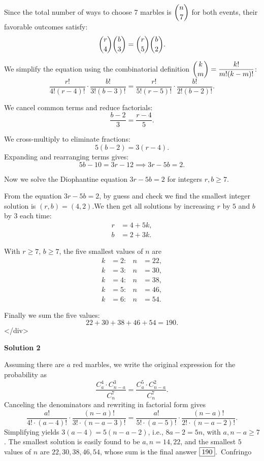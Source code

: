 \begin{enumerate}
 Since the total number of ways to choose 7 marbles is $\dbinom{n}{7}$ for both events, their favorable outcomes satisfy:
 \[\dbinom{r}{4}\dbinom{b}{3}=\dbinom{r}{5}\dbinom{b}{2}.\]

 We simplify the equation using the combinatorial definition $\dbinom{k}{m}=\dfrac{k!}{m!(k-m)!}$:
 \[\frac{r!}{4!(r-4)!}\cdot\frac{b!}{3!(b-3)!}=\frac{r!}{5!(r-5)!}\cdot\frac{b!}{2!(b-2)!}.\]

 We cancel common terms and reduce factorials:
 \[\frac{b-2}{3}=\frac{r-4}{5}.\]

 We cross-multiply to eliminate fractions:
 \[5(b-2)=3(r-4).\]Expanding and rearranging terms gives:
 \[5b-10=3r-12 \implies 3r-5b=2.\]

 Now we solve the Diophantine equation $3r-5b=2$ for integers $r,b\geq7$.

 From the equation $3r - 5b = 2$, by guess and check we find the smallest integer solution is $(r,b) = (4,2)$.We then get all solutions by increasing $r$ by $5$ and $b$ by $3$ each time:\begin{align*}r &= 4 + 5k, \\b &= 2 + 3k.\end{align*}


 With $r\ge7$, $b\ge7$, the five smallest values of $n$ are\begin{align*}k &= 2: & n &= 22, \\k &= 3: & n &= 30, \\k &= 4: & n &= 38, \\k &= 5: & n &= 46, \\k &= 6: & n &= 54.\end{align*}


 Finally we sum the five values:
 \[22+30+38+46+54=\boxed{190}.\]
</div>



\textbf{Solution 2}

Assuming there are $a$ red marbles, we write the original expression for the probability as 
 \[\dfrac{C_a^4\cdot C_{n-a}^3}{C_n^7}=\dfrac{C_a^5\cdot C_{n-a}^2}{C_n^7}.\]Canceling the denominators and rewriting in factorial form gives 
 \[\dfrac{a!}{4!\cdot(a-4)!}\cdot\dfrac{(n-a)!}{3!\cdot(n-a-3)!}=\dfrac{a!}{5!\cdot(a-5)!}\cdot\dfrac{(n-a)!}{2!\cdot(n-a-2)!}.\]Simplifying yields $3(a-4)=5(n-a-2)$, i.e., $8a-2=5n$, with $a,n-a\ge7$. The smallest solution is easily found to be $a,n=14,22$, and the smallest $5$ values of $n$ are $22,30,38,46,54$, whose sum is the final answer $\fbox{190}$.~Confringo


\end{enumerate}
